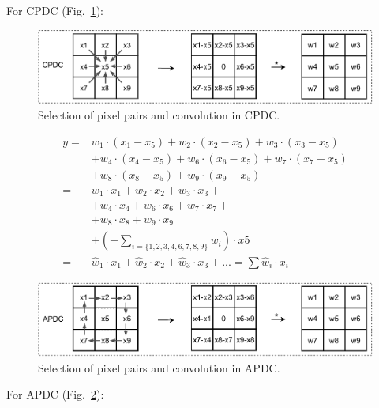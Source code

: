 \documentclass[10pt,twocolumn,letterpaper]{article}
\begin{document}
\vspace{0.3em}
\noindent For CPDC (Fig.~\ref{fig:cpdc}):

\begin{figure}[t!]
    \centering
    \includegraphics[width=0.95\linewidth]{images/supplement_cpdc.pdf}
    \caption{Selection of pixel pairs and convolution in CPDC.}
    \label{fig:cpdc}
\end{figure}


{\small 
\begin{align}
    y =& w_{1}\cdot (x_1 - x_5) + w_2\cdot (x_2 - x_5)+w_3\cdot (x_3 - x_5)\nonumber\\
    & + w_4\cdot (x_4-x_5) + w_6\cdot (x_6 - x_5) + w_7\cdot (x_7 - x_5)\nonumber \\
    & + w_8\cdot (x_8 - x_5) + w_9\cdot (x_9 - x_5)\nonumber \\
    =&w_1\cdot x_1 + w_2\cdot x_2 + w_3\cdot x_3 +\nonumber \\
    & + w_4\cdot x_4 + w_6\cdot x_6 + w_7\cdot x_7 +\nonumber \\
    & + w_8\cdot x_8 + w_9\cdot x_9\nonumber \\
    & + (-\sum_{i=\{1,2,3,4,6,7,8,9\}}w_i)\cdot x5\nonumber \\
    =&\hat{w}_1\cdot x_1 + \hat{w}_2\cdot x_2 + \hat{w}_3\cdot x_3 + ... =\sum \hat{w}_i\cdot x_i
\end{align}
}

\begin{figure}[t!]
    \centering
    \includegraphics[width=0.95\linewidth]{images/supplement_apdc.pdf}
    \caption{Selection of pixel pairs and convolution in APDC.}
    \label{fig:apdc}
\end{figure}

\vspace{0.3em}
\noindent For APDC (Fig.~\ref{fig:apdc}):
\end{document}
